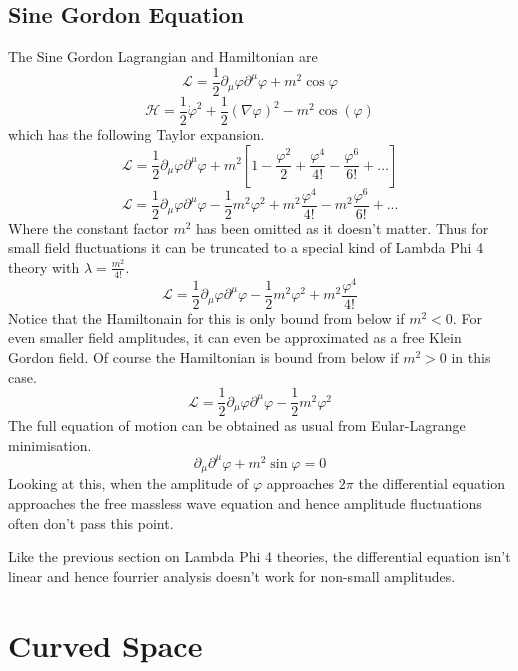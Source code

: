 \documentclass[11pt, oneside]{report}  %
\numberwithin{equation}{section}
\begin{document}
\subsection{Sine Gordon Equation}
The Sine Gordon Lagrangian and Hamiltonian are  
$$ \mathcal{L} = \frac{1}{2}\partial_\mu\varphi \partial^\mu \varphi + m^2 \cos\varphi$$
$$ \mathcal{H} =\frac{1}{2}\dot\varphi^2 + \frac{1}{2}(\nabla\varphi)^2 - m^2\cos(\varphi)$$
which has the following Taylor expansion.
$$  \mathcal{L} = \frac{1}{2}\partial_\mu\varphi \partial^\mu \varphi +m^2 \left[ 1 -\frac{\varphi^2}{2} + \frac{\varphi^4}{4!} -\frac{\varphi^6}{6!}+ ... \right]$$
$$  \mathcal{L} = \frac{1}{2}\partial_\mu\varphi \partial^\mu \varphi -\frac{1}{2}m^2 \varphi^2 + m^2 \frac{\varphi^4}{4!} -m^2\frac{\varphi^6}{6!} + ... $$
Where the constant factor $m^2$ has been omitted as it doesn't matter. Thus for small field fluctuations it can be truncated to a special kind of Lambda Phi 4 theory with $\lambda = \frac{m^2}{4!}$.
$$  \mathcal{L} = \frac{1}{2}\partial_\mu\varphi \partial^\mu \varphi -\frac{1}{2}m^2 \varphi^2 + m^2 \frac{\varphi^4}{4!}$$ 
Notice that the Hamiltonain for this is only bound from below if $m^2<0$. For even smaller field amplitudes, it can even be approximated as a free Klein Gordon field. Of course the Hamiltonian is bound from below if $m^2>0$ in this case.
 $$\mathcal{L} = \frac{1}{2}\partial_\mu\varphi \partial^\mu \varphi -\frac{1}{2}m^2 \varphi^2$$
The full equation of motion can be obtained as usual from Eular-Lagrange minimisation.
$$ \boxed{\partial_\mu\partial^\mu\varphi  + m^2 \sin\varphi =0}$$
Looking at this, when the amplitude of $\varphi$ approaches $2\pi$ the differential equation approaches the free massless wave equation and hence amplitude fluctuations often don't pass this point. 

Like the previous section on Lambda Phi 4 theories, the differential equation isn't linear and hence fourrier analysis doesn't work for non-small amplitudes.

\section{Curved Space}
\end{document}
